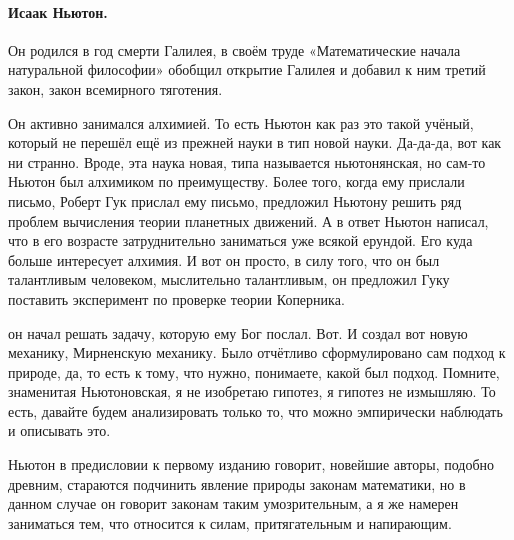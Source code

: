\paragraph{Исаак Ньютон.} 

Он родился в год смерти Галилея, в
своём труде «Математические начала натуральной философии» обобщил открытие
Галилея и добавил к ним третий закон, закон всемирного тяготения. 


Он активно занимался алхимией. То есть Ньютон как раз это такой
учёный, который не перешёл ещё из прежней науки в тип новой науки. Да-да-да, вот
как ни странно. Вроде, эта наука новая, типа называется ньютонянская, но сам-то
Ньютон был алхимиком по преимуществу. Более того, когда ему прислали письмо,
Роберт Гук прислал ему письмо, предложил Ньютону решить ряд проблем вычисления
теории планетных движений. А в ответ Ньютон написал, что в его возрасте
затруднительно заниматься уже всякой ерундой. Его куда больше интересует
алхимия. И вот он просто, в силу того, что он был талантливым человеком,
мыслительно талантливым, он предложил Гуку поставить эксперимент по проверке
теории Коперника. 


он начал решать задачу, которую ему Бог послал. Вот. И создал вот
новую механику, Мирненскую механику. Было отчётливо сформулировано сам подход к
природе, да, то есть к тому, что нужно, понимаете, какой был подход. Помните,
знаменитая Ньютоновская, я не изобретаю гипотез, я гипотез не измышляю. То есть,
давайте будем анализировать только то, что можно эмпирически наблюдать и
описывать это. 

Ньютон в предисловии к первому изданию говорит, новейшие авторы,
подобно древним, стараются подчинить явление природы законам математики, но в
данном случае он говорит законам таким умозрительным, а я же намерен заниматься
тем, что относится к силам, притягательным и напирающим. 

